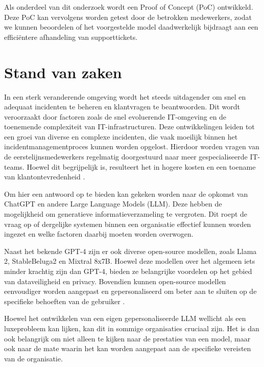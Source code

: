 Als onderdeel van dit onderzoek wordt een Proof of Concept (PoC) ontwikkeld. Deze PoC kan vervolgens worden getest door de betrokken medewerkers, zodat we kunnen beoordelen of het voorgestelde model daadwerkelijk bijdraagt aan een efficiëntere afhandeling van supporttickets.


\section{Stand van zaken}%
\label{sec:stand van zaken}

In een sterk veranderende omgeving wordt het steeds uitdagender om snel en adequaat incidenten te beheren en klantvragen te beantwoorden. Dit wordt veroorzaakt door factoren zoals de snel evoluerende IT-omgeving en de toenemende complexiteit van IT-infrastructuren. Deze ontwikkelingen leiden tot een groei van diverse en complexe incidenten, die vaak moeilijk binnen het incidentmanagementproces kunnen worden opgelost. Hierdoor worden vragen van de eerstelijnsmedewerkers regelmatig doorgestuurd naar meer gespecialiseerde IT-teams. Hoewel dit begrijpelijk is, resulteert het in hogere kosten en een toename van klantontevredenheid \autocite{Schmidt2024}.

Om hier een antwoord op te bieden kan gekeken worden naar de opkomst van ChatGPT en andere Large Language Models (LLM). Deze hebben de mogelijkheid om generatieve informatieverzameling te vergroten. Dit roept de vraag op of dergelijke systemen binnen een organisatie effectief kunnen worden ingezet en welke factoren daarbij moeten worden overwogen.

Naast het bekende GPT-4 zijn er ook diverse open-source modellen, zoals Llama 2, StableBeluga2 en Mixtral 8x7B. Hoewel deze modellen over het algemeen iets minder krachtig zijn dan GPT-4, bieden ze belangrijke voordelen op het gebied van dataveiligheid en privacy. Bovendien kunnen open-source modellen eenvoudiger worden aangepast en gepersonaliseerd om beter aan te sluiten op de specifieke behoeften van de gebruiker \autocite{KernanFreire2024}.

Hoewel het ontwikkelen van een eigen gepersonaliseerde LLM wellicht als een luxeprobleem kan lijken, kan dit in sommige organisaties cruciaal zijn. Het is dan ook belangrijk om niet alleen te kijken naar de prestaties van een model, maar ook naar de mate waarin het kan worden aangepast aan de specifieke vereisten van de organisatie.

